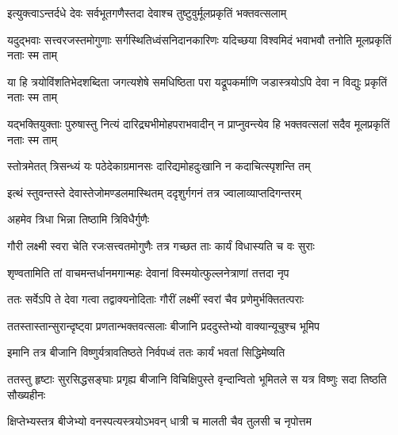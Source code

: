 \twolineshloka
{इत्युक्त्वाऽन्तर्दधे देवः सर्वभूतगणैस्तदा}
{देवाश्च तुष्टुवुर्मूलप्रकृतिं भक्तवत्सलाम्} %


\fourlineindentedshloka
{यदुद्भवाः सत्त्वरजस्तमोगुणाः}
{सर्गस्थितिध्वंसनिदानकारिणः}
{यदिच्छया विश्वमिदं भवाभवौ}
{तनोति मूलप्रकृतिं नताः स्म ताम्} %

\fourlineindentedshloka
{या हि त्रयोविंशतिभेदशब्दिता}
{जगत्यशेषे समधिष्ठिता परा}
{यद्रूपकर्माणि जडास्त्रयोऽपि}
{देवा न विद्युः प्रकृतिं नताः स्म ताम्} %

\fourlineindentedshloka
{यद्भक्तियुक्ताः पुरुषास्तु नित्यं}
{दारिद्र्यभीमोहपराभवादीन्}
{न प्राप्नुवन्त्येव हि भक्तवत्सलां}
{सदैव मूलप्रकृतिं नताः स्म ताम्} %


\twolineshloka
{स्तोत्रमेतत् त्रिसन्ध्यं यः पठेदेकाग्रमानसः}
{दारिद्यमोहदुःखानि न कदाचित्स्पृशन्ति तम्} %

\twolineshloka
{इत्थं स्तुवन्तस्ते देवास्तेजोमण्डलमास्थितम्}
{ददृशुर्गगनं तत्र ज्वालाव्याप्तदिगन्तरम्} %




\onelineshloka
{अहमेव त्रिधा भिन्ना तिष्ठामि त्रिविधैर्गुणैः} %

\twolineshloka
{गौरी लक्ष्मी स्वरा चेति रजःसत्त्वतमोगुणैः}
{तत्र गच्छत ताः कार्यं विधास्यति च वः सुराः} %


\twolineshloka
{शृण्वतामिति तां वाचमन्तर्धानमगान्महः}
{देवानां विस्मयोत्फुल्लनेत्राणां तत्तदा नृप} %

\twolineshloka
{ततः सर्वेऽपि ते देवा गत्वा तद्वाक्यनोदिताः}
{गौरीं लक्ष्मीं स्वरां चैव प्रणेमुर्भक्तितत्पराः} %

\twolineshloka
{ततस्तास्तान्सुरान्दृष्ट्वा प्रणतान्भक्तवत्सलाः}
{बीजानि प्रददुस्तेभ्यो वाक्यान्यूचुश्च भूमिप} %


\twolineshloka
{इमानि तत्र बीजानि विष्णुर्यत्रावतिष्ठते}
{निर्वपध्वं ततः कार्यं भवतां सिद्धिमेष्यति} %

\fourlineindentedshloka
{ततस्तु हृष्टाः सुरसिद्धसङ्घाः}
{प्रगृह्य बीजानि विचिक्षिपुस्ते}
{वृन्दान्वितो भूमितले स यत्र}
{विष्णुः सदा तिष्ठति सौख्यहीनः} %





\twolineshloka
{क्षिप्तेभ्यस्तत्र बीजेभ्यो वनस्पत्यस्त्रयोऽभवन्}
{धात्री च मालती चैव तुलसी च नृपोत्तम} %

